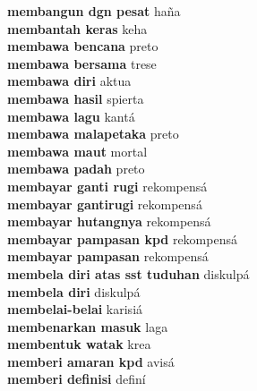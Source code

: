 \textbf{ membangun dgn pesat  } haña \\
\textbf{ membantah keras  } keha \\
\textbf{ membawa bencana  } preto \\
\textbf{ membawa bersama  } trese \\
\textbf{ membawa diri  } aktua \\
\textbf{ membawa hasil  } spierta \\
\textbf{ membawa lagu  } kantá \\
\textbf{ membawa malapetaka  } preto \\
\textbf{ membawa maut  } mortal \\
\textbf{ membawa padah  } preto \\
\textbf{ membayar ganti rugi  } rekompensá \\
\textbf{ membayar gantirugi  } rekompensá \\
\textbf{ membayar hutangnya  } rekompensá \\
\textbf{ membayar pampasan kpd  } rekompensá \\
\textbf{ membayar pampasan  } rekompensá \\
\textbf{ membela diri  atas sst tuduhan  } diskulpá \\
\textbf{ membela diri  } diskulpá \\
\textbf{ membelai-belai  } karisiá \\
\textbf{ membenarkan masuk  } laga \\
\textbf{ membentuk watak  } krea \\
\textbf{ memberi amaran kpd  } avisá \\
\textbf{ memberi definisi  } definí \\
